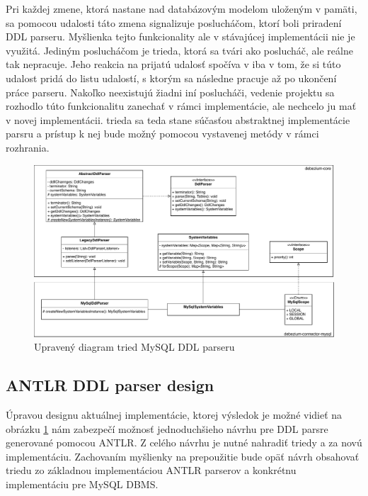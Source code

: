 Pri každej zmene, ktorá nastane nad databázovým modelom uloženým v pamäti, sa pomocou udalosti táto zmena signalizuje poslucháčom, ktorí boli priradení DDL parseru. Myšlienka tejto funkcionality ale v stávajúcej implementácii nie je využitá. Jediným poslucháčom je  trieda, ktorá sa tvári ako poslucháč, ale reálne tak nepracuje. Jeho reakcia na prijatú udalosť spočíva v iba v tom, že si túto udalost pridá do listu udalostí, s ktorým sa následne pracuje až po ukončení práce parseru. Nakoľko neexistujú žiadni iní poslucháči, vedenie projektu sa rozhodlo túto funkcionalitu zanechať v rámci  implementácie, ale nechcelo ju mať v novej implementácii.  trieda sa teda stane súčasťou abstraktnej implementácie parsru a prístup k nej bude možný pomocou vystavenej metódy v rámci  rozhrania.

\begin{figure}[H]
\begin{center}
\includegraphics[width=15cm]{figures/New_design.pdf}
\caption{Upravený diagram tried MySQL DDL parseru}
\label{fig:class_diagram_new}
\end{center}
\end{figure}

\subsection{ANTLR DDL parser design}
Úpravou designu aktuálnej implementácie, ktorej výsledok je možné vidieť na obrázku \ref{fig:class_diagram_new} nám zabezpečí možnosť jednoduchšieho návrhu pre DDL parsre generované pomocou \mbox{ANTLR}. Z celého návrhu je nutné nahradiť triedy  a  za novú implementáciu. Zachovaním myšlienky na prepoužitie bude opäť návrh obsahovať triedu zo základnou implementáciou ANTLR parserov a konkrétnu implementáciu pre MySQL DBMS.

